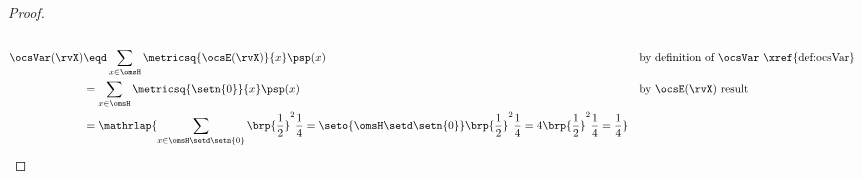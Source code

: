 \begin{tabstr}{0.75}
\begin{proof}
\begin{align*}
  \\
  \ocsVar(\rvX)
    &\eqd \sum_{x\in\omsH}\metricsq{\ocsE(\rvX)}{x}\psp(x)
    && \text{by definition of $\ocsVar$ \xref{def:ocsVar}}
  \\&= \sum_{x\in\omsH}\metricsq{\setn{0}}{x}\psp(x)
    && \text{by $\ocsE(\rvX)$ result}
  \\&= \mathrlap{
       \sum_{x\in\omsH\setd\setn{0}}\brp{\frac{1}{2}}^2\frac{1}{4}
     = \seto{\omsH\setd\setn{0}}\brp{\frac{1}{2}}^2\frac{1}{4}
     = 4\brp{\frac{1}{2}}^2\frac{1}{4}
     = \frac{1}{4}
     }
\end{align*}
\end{proof}


\end{tabstr}
